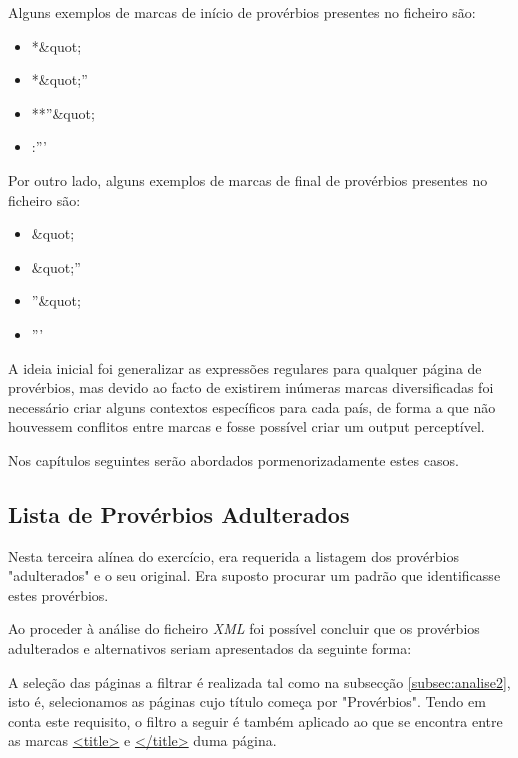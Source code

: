 \documentclass[11pt,a4paper]{report}
\begin{document}
	\vspace{0.2cm}

Alguns exemplos de marcas de início de provérbios presentes no ficheiro são:
\begin{itemize}
 \item *\&quot;
 \item *\&quot;''
 \item **''\&quot;
 \item :'''
\end{itemize}

	\vspace{0.2cm}

Por outro lado, alguns exemplos de marcas de final de provérbios presentes no ficheiro são:
\begin{itemize}
 \item \&quot;
 \item \&quot;''
 \item ''\&quot;
 \item '''
\end{itemize}

	\vspace{0.2cm}

A ideia inicial foi generalizar as expressões regulares para qualquer página de provérbios, mas devido ao facto de existirem inúmeras marcas diversificadas foi necessário criar alguns contextos específicos para cada país, de forma a que não houvessem conflitos entre marcas e fosse possível criar um output perceptível.

Nos capítulos seguintes serão abordados pormenorizadamente estes casos.


\subsection{Lista de Provérbios Adulterados}

Nesta terceira alínea do exercício, era requerida a listagem dos provérbios "adulterados" e o seu original. Era suposto procurar um padrão que identificasse estes provérbios.

Ao proceder à análise do ficheiro \textit{XML} foi possível concluir que os provérbios adulterados e alternativos seriam apresentados da seguinte forma:


A seleção das páginas a filtrar é realizada tal como na subsecção \ref{subsec:analise2}, isto é, selecionamos as páginas cujo título começa por "Provérbios". Tendo em conta este requisito, o filtro a seguir é também aplicado ao que se encontra entre as marcas \underline{<title>} e \underline{</title>} duma página.
\end{document}
